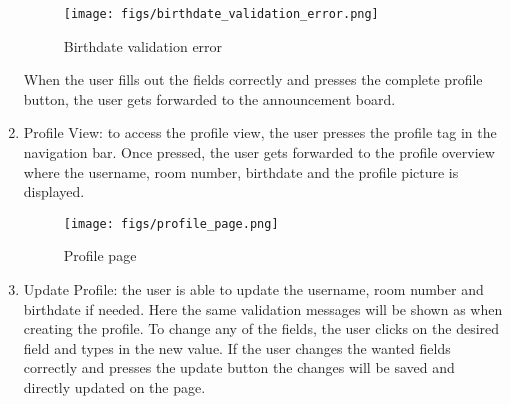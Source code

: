\documentclass[conference]{IEEEtran}
\begin{document}
\begin{enumerate}
    \begin{figure}[H]
    \centering
    \texttt{[image: figs/birthdate\_validation\_error.png]}
    \caption{Birthdate validation error}
    \label{fig:Birthdate validation error}
    \end{figure}
    When the user fills out the fields correctly and presses the complete profile button, the user gets forwarded to the announcement board.
    \item Profile View: to access the profile view, the user presses the profile tag in the navigation bar. Once pressed, the user gets forwarded to the profile overview where the username, room number, birthdate and the profile picture is displayed.
    \begin{figure}[H]
    \centering
    \texttt{[image: figs/profile\_page.png]}
    \caption{Profile page}
    \label{fig:Profile page}
    \end{figure}
    \item Update Profile: the user is able to update the username, room number and birthdate if needed. Here the same validation messages will be shown as when creating the profile. To change any of the fields, the user clicks on the desired field and types in the new value. If the user changes the wanted fields correctly and presses the update button the changes will be saved and directly updated on the page.
\end{enumerate}
\end{document}
